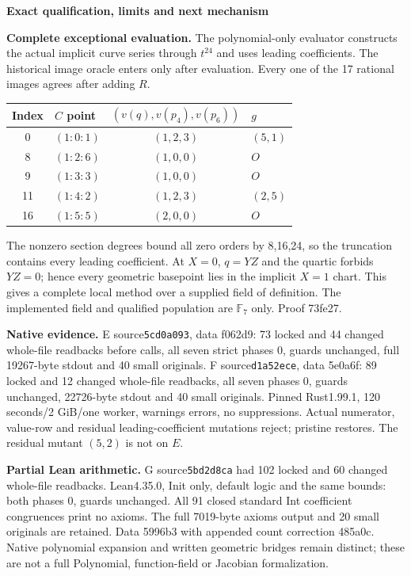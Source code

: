 \documentclass[10pt,a4paper]{article}
\begin{document}
\newpage
{\Large\bfseries Exact qualification, limits and next mechanism}\par

\textbf{Complete exceptional evaluation.} The polynomial-only evaluator
constructs the actual implicit curve series through $t^{24}$ and uses
leading coefficients. The historical image oracle enters only after
evaluation. Every one of the 17 rational images agrees after adding $R$.
\begin{center}
\begin{tabular}{clcl}
\toprule
Index & $C$ point & $(v(q),v(p_4),v(p_6))$ & $g$\\
\midrule
0 & $(1:0:1)$ & $(1,2,3)$ & $(5,1)$\\
8 & $(1:2:6)$ & $(1,0,0)$ & $O$\\
9 & $(1:3:3)$ & $(1,0,0)$ & $O$\\
11 & $(1:4:2)$ & $(1,2,3)$ & $(2,5)$\\
16 & $(1:5:5)$ & $(2,0,0)$ & $O$\\
\bottomrule
\end{tabular}
\end{center}
The nonzero section degrees bound all zero orders by 8,16,24, so the
truncation contains every leading coefficient. At $X=0$, $q=YZ$ and
the quartic forbids $YZ=0$; hence every geometric basepoint lies in
the implicit $X=1$ chart. This gives a complete local method over a
supplied field of definition. The implemented field and qualified
population are $\mathbb F_7$ only. Proof 73fe27.

\textbf{Native evidence.} E source\texttt{5cd0a093}, data f062d9:
73 locked and 44 changed whole-file readbacks before calls, all seven
strict phases 0, guards unchanged, full 19267-byte stdout and 40 small
originals. F source\texttt{d1a52ece}, data 5e0a6f: 89 locked and 12
changed whole-file readbacks, all seven phases 0, guards unchanged,
22726-byte stdout and 40 small originals. Pinned Rust1.99.1,
120 seconds/2 GiB/one worker, warnings errors, no suppressions.
Actual numerator, value-row and residual leading-coefficient mutations
reject; pristine restores. The residual mutant $(5,2)$ is not on $E$.

\textbf{Partial Lean arithmetic.} G source\texttt{5bd2d8ca} had 102
locked and 60 changed whole-file readbacks. Lean4.35.0, Init only,
default logic and the same bounds: both phases 0, guards unchanged.
All 91 closed standard Int coefficient congruences print no axioms.
The full 7019-byte axioms output and 20 small originals are retained.
Data 5996b3 with appended count correction 485a0c. Native polynomial
expansion and written geometric bridges remain distinct; these are
not a full Polynomial, function-field or Jacobian formalization.
\end{document}
